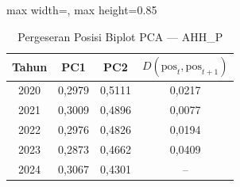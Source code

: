 \begin{table}[H]
\centering
\caption{Pergeseran Posisi Biplot PCA --- AHH\_P} \label{tab:appjarak_pca_loading_ahh_p}
\begin{adjustbox}{max width=\textwidth, max height=0.85\textheight}
\begin{tabular}{|c|c|c|c|}
\hline
\textbf{Tahun} & \textbf{PC1} & \textbf{PC2} & \textbf{$D(\text{pos}_t, \text{pos}_{t+1})$} \\
\hline
2020 & 0,2979 & 0,5111 & 0,0217 \\
2021 & 0,3009 & 0,4896 & 0,0077 \\
2022 & 0,2976 & 0,4826 & 0,0194 \\
2023 & 0,2873 & 0,4662 & 0,0409 \\
2024 & 0,3067 & 0,4301 & -- \\
\hline
\end{tabular}
\end{adjustbox}
\end{table}